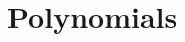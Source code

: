 \documentclass[class=linear-algebra,crop=false]{standalone}
\begin{document}
\chapter{Polynomials}
\end{document}
